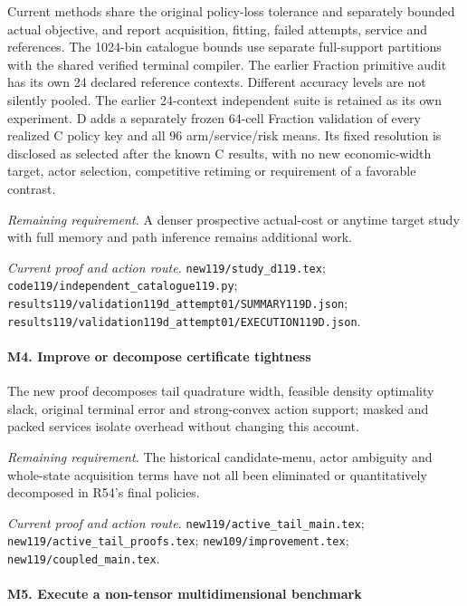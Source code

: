 Current methods share the original policy-loss tolerance and separately bounded actual objective, and report acquisition, fitting, failed attempts, service and references. The 1024-bin catalogue bounds use separate full-support partitions with the shared verified terminal compiler. The earlier Fraction primitive audit has its own 24 declared reference contexts. Different accuracy levels are not silently pooled. The earlier 24-context independent suite is retained as its own experiment. D adds a separately frozen 64-cell Fraction validation of every realized C policy key and all 96 arm/\allowbreak{}service/\allowbreak{}risk means. Its fixed resolution is disclosed as selected after the known C results, with no new economic-width target, actor selection, competitive retiming or requirement of a favorable contrast.

\par\emph{Remaining requirement.} A denser prospective actual-cost or anytime target study with full memory and path inference remains additional work.

\par\emph{Current proof and action route.} \nolinkurl{new119/study_d119.tex}; \nolinkurl{code119/independent_catalogue119.py}; \nolinkurl{results119/validation119d_attempt01/SUMMARY119D.json}; \nolinkurl{results119/validation119d_attempt01/EXECUTION119D.json}.

\paragraph{M4. Improve or decompose certificate tightness}

The new proof decomposes tail quadrature width, feasible density optimality slack, original terminal error and strong-convex action support; masked and packed services isolate overhead without changing this account.

\par\emph{Remaining requirement.} The historical candidate-menu, actor ambiguity and whole-state acquisition terms have not all been eliminated or quantitatively decomposed in R54's final policies.

\par\emph{Current proof and action route.} \nolinkurl{new119/active_tail_main.tex}; \nolinkurl{new119/active_tail_proofs.tex}; \nolinkurl{new109/improvement.tex}; \nolinkurl{new119/coupled_main.tex}.

\paragraph{M5. Execute a non-tensor multidimensional benchmark}

